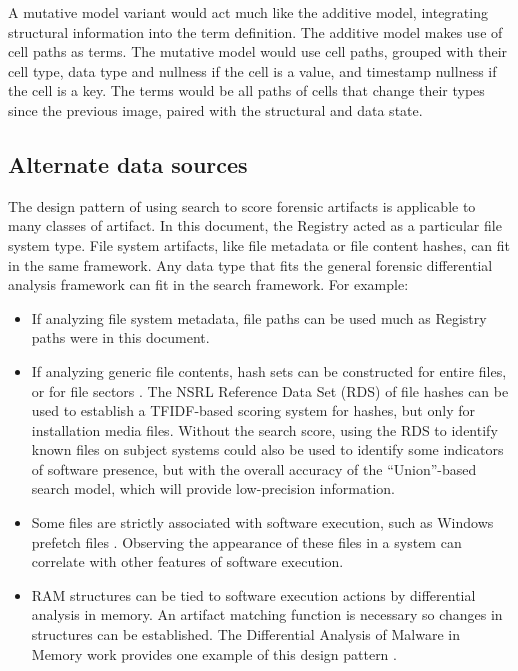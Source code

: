 \documentclass[11pt]{ucthesis}
\theoremstyle{plain}
\theoremstyle{definition}
\begin{document}
A mutative model variant would act much like the additive model, integrating structural information into the term definition.  The additive model makes use of cell paths as terms.  The mutative model would use cell paths, grouped with their cell type, data type and nullness if the cell is a value, and timestamp nullness if the cell is a key.  The terms would be all paths of cells that change their types since the previous image, paired with the structural and data state.


\subsection{Alternate data sources}

The design pattern of using search to score forensic artifacts is applicable to many classes of artifact.  In this document, the Registry acted as a particular file system type.  File system artifacts, like file metadata or file content hashes, can fit in the same framework.  Any data type that fits the general forensic differential analysis framework can fit in the search framework.  For example:

\begin{itemize}
\item If analyzing file system metadata, file paths can be used much as Registry paths were in this document.
\item If analyzing generic file contents, hash sets can be constructed for entire files, or for file sectors \cite{garfinkel:dfrws15}.  The NSRL Reference Data Set (RDS) of file hashes can be used to establish a TFIDF-based scoring system for hashes, but only for installation media files.  Without the search score, using the RDS to identify known files on subject systems could also be used to identify some indicators of software presence, but with the overall accuracy of the ``Union''-based search model, which will provide low-precision information.
\item Some files are strictly associated with software execution, such as Windows prefetch files \cite{garcia:npscs11008}.  Observing the appearance of these files in a system can correlate with other features of software execution.
\item RAM structures can be tied to software execution actions by differential analysis in memory.  An artifact matching function is necessary so changes in structures can be established.  The Differential Analysis of Malware in Memory work provides one example of this design pattern \cite{marziale:osdfcon14}.
\end{itemize}
\end{document}
